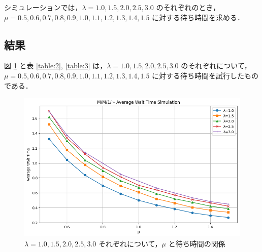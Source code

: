 \documentclass[fleqn, a4paper. 12pt]{jsarticle}
\begin{document}
        シミュレーションでは，$\lambda = 1.0, 1.5, 2.0, 2.5, 3.0$ のそれぞれのとき， $\mu = 0.5, 0.6, 0.7, 0.8, 0.9, 1.0, 1.1, 1.2, 1.3, 1.4, 1.5$ に対する待ち時間を求める．
        
      \subsection*{結果}
  
        図 \ref{fig:10} と表 \ref{table:2}, \ref{table:3} は，$\lambda = 1.0, 1.5, 2.0, 2.5, 3.0$ のそれぞれについて， $\mu = 0.5, 0.6, 0.7, 0.8, 0.9, 1.0, 1.1, 1.2, 1.3, 1.4, 1.5$ に対する待ち時間を試行したものである．
  
        \begin{figure}[!h]
          \centering
          \includegraphics[width=1\textwidth]{plot_3_A.png}
          \caption{$\lambda = 1.0, 1.5, 2.0, 2.5, 3.0$ それぞれについて，$\mu$ と待ち時間の関係}
          \label{fig:10}
        \end{figure}
\end{document}
